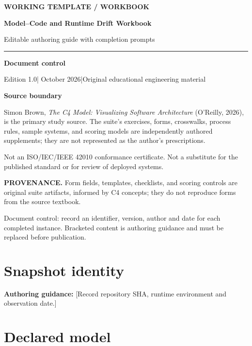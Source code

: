 \documentclass[10pt,letterpaper]{article}
\newcommand{\WritingSpace}[1]{\par\vspace{2pt}\noindent\fcolorbox{C4Line}{white}{\parbox[t][#1][t]{0.94\linewidth}{\hspace{1pt}}}\par\vspace{7pt}}
\newcommand{\Prompter}[1]{\par{\small\color{C4Teal}\textbf{Authoring guidance:} #1}\par}
\newcommand{\SourceNote}[1]{\par\smallskip\noindent\colorbox{C4Light}{\parbox{0.94\linewidth}{\footnotesize\textbf{PROVENANCE.} #1}}\par\medskip}
\newcommand{\DocStart}[3]{%
\begin{document}
\begin{titlepage}
\renewcommand{\thepage}{title-\arabic{page}}
\vspace*{0.55in}
{\sffamily\bfseries\small\color{C4Teal}#1}\par\vspace{0.24in}
{\sffamily\bfseries\fontsize{26}{31}\selectfont\color{C4Navy}#2}\par\vspace{0.18in}
{\large\color{C4Gray}#3}\par\vspace{0.4in}
\textcolor{C4Teal}{\rule{\linewidth}{1.15pt}}\par\vspace{0.24in}
\textbf{Document control}\par
Edition 1.0\quad|\quad 30 October 2026\quad|\quad Original educational engineering material\par
\vspace{0.17in}
\textbf{Source boundary}\par
Simon Brown, \emph{The C4 Model: Visualizing Software Architecture} (O'Reilly, 2026), is the primary study source. The suite's exercises, forms, crosswalks, process rules, sample systems, and scoring models are independently authored supplements; they are not represented as the author's prescriptions.\par
\vfill
{\small\color{C4Gray}Not an ISO/IEC/IEEE 42010 conformance certificate. Not a substitute for the published standard or for review of deployed systems.}\par
\end{titlepage}
}
\DocStart{WORKING TEMPLATE / WORKBOOK}{Model–Code and Runtime Drift Workbook}{Editable authoring guide with completion prompts}
\SourceNote{Form fields, templates, checklists, and scoring controls are original suite artifacts, informed by C4 concepts; they do not reproduce forms from the source textbook.}
Document control: record an identifier, version, author and date for each completed instance. Bracketed content is authoring guidance and must be replaced before publication.

\section{Snapshot identity}

\Prompter{[Record repository SHA, runtime environment and observation date.]}
\WritingSpace{0.65in}
\section{Declared model}
\end{document}
